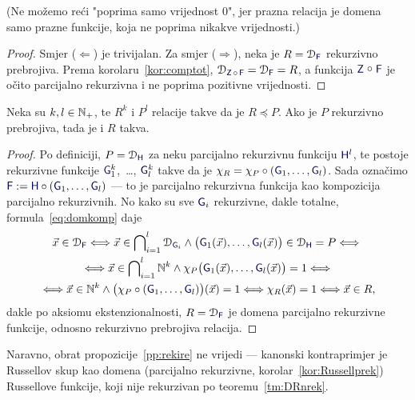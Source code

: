(Ne možemo reći "poprima samo vrijednost $0$", jer prazna relacija je domena samo prazne funkcije, koja ne poprima nikakve vrijednosti.)

\begin{proof}
    Smjer ($\Leftarrow$) je trivijalan. Za smjer ($\Rightarrow$), neka je $R=\dom{\f F}$ rekurzivno prebrojiva. Prema korolaru~\ref{kor:comptot}, $\dom{\f Z\,\circ\,\f F}=\dom{\f F}=R$, a funkcija $\f Z\mathrel{\raisebox{1pt}{$\circ$}}\f F$ je očito parcijalno rekurzivna i ne poprima pozitivne vrijednosti.
\end{proof}

\begin{lema}[{name=[svedivost čuva rekurzivnu prebrojivost]}]\label{lm:re<re}
Neka su $k,l\in{\mathbb N}_+$, te $R^k$ i $P^l$ relacije takve da je $R\preceq P$. Ako je $P$ rekurzivno prebrojiva, tada je i $R$ takva.
\end{lema}
\begin{proof}
Po definiciji, $P=\dom{\f H}$ za neku parcijalno rekurzivnu funkciju $\f H^l$, te postoje rekurzivne funkcije $\f G_1^k$,~\ldots, $\f G_l^k$ takve da je $\chi_R=\chi_P\circ(\f G_1,\dotsc,\f G_l)$. Sada označimo $\f F:=\f H\circ(\f G_1,\dotsc,\f G_l)$ --- to je parcijalno rekurzivna funkcija kao kompozicija parcijalno rekurzivnih. No kako su sve $\f G_i$ rekurzivne, dakle totalne, formula~\eqref{eq:domkomp} daje
\begin{multline}
    \vec x\in\dom{\f F}\Longleftrightarrow
    \vec x\in\bigcap\nolimits_{i=1}^l\dom{\f G_i}\land
    \bigl(\f G_1(\vec x),\dotsc,\f G_l(\vec x)\bigr)\in\dom{\f H}=P\Longleftrightarrow{}\\
    {}\Longleftrightarrow\vec x\in\bigcap\nolimits_{i=1}^l\N^k\land\chi_P\bigl(\f G_1(\vec x),\dotsc,\f G_l(\vec x)\bigr)=1\Longleftrightarrow{}\\
    {}\Longleftrightarrow\vec x\in\N^k\land\bigl(\chi_P\circ(\f G_1,\dotsc,\f G_l)\bigr)(\vec x)=1\Longleftrightarrow\chi_R(\vec x)=1\Longleftrightarrow\vec x\in R\text,
\end{multline}
dakle po aksiomu ekstenzionalnosti, $R=\dom{\f F}$ je domena parcijalno rekurzivne funkcije, odnosno rekurzivno prebrojiva relacija.
\end{proof}

Naravno, obrat propozicije~\ref{pp:rekire} ne vrijedi --- kanonski kontraprimjer je Russellov skup kao domena (parcijalno rekurzivne, korolar~\ref{kor:Russellprek}) Russellove funkcije, koji nije rekurzivan po teoremu~\ref{tm:DRnrek}.

